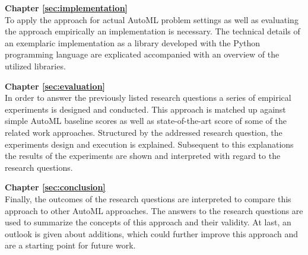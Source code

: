 \textbf{Chapter \ref{sec:implementation}} \\[0.2em]
To apply the approach for actual AutoML problem settings as well as evaluating the approach empirically an implementation is necessary.
The technical details of an exemplaric implementation as a library developed with the Python programming language are explicated accompanied with an overview of the utilized libraries.

\textbf{Chapter \ref{sec:evaluation}} \\[0.2em]
In order to answer the previously listed research questions a series of empirical experiments is designed and conducted.
This approach is matched up against simple AutoML baseline scores as well as state-of-the-art score of some of the related work approaches.
Structured by the addressed research question, the experiments design and execution is explained.
Subsequent to this explanations the results of the experiments are shown and interpreted with regard to the research questions.

\textbf{Chapter \ref{sec:conclusion}} \\[0.2em]
Finally, the outcomes of the research questions are interpreted to compare this approach to other AutoML approaches.
The answers to the research questions are used to summarize the concepts of this approach and their validity.
At last, an outlook is given about additions, which could further improve this approach and are a starting point for future work.
